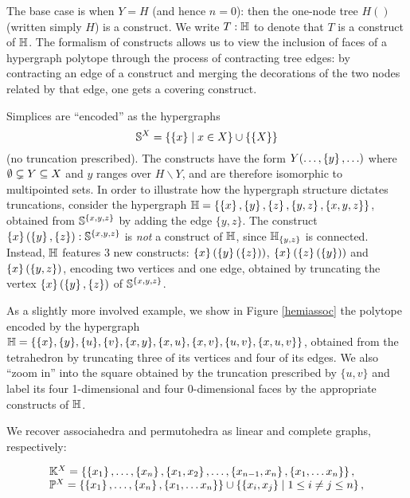 \smallskip
 The base case is when $Y=H$ (and hence $n=0$): then the one-node tree $H()$ (written simply $H$) is a construct.
We write $T:{\mathbb H}$ to denote that $T$ is a construct of ${\mathbb H}$. 
The formalism of constructs   allows us to view the inclusion of faces of a hypergraph polytope through the process of contracting tree edges: by contracting an edge of a construct and  merging the decorations of the two nodes related by that edge, one gets a covering construct.

\smallskip
Simplices are ``encoded'' as the hypergraphs  $${\mathbb S}^X=\left\{\left\{x\right\} \mid x\in X\right\}\cup\left\{\left\{X\right\}\right\}$$ (no truncation prescribed). The constructs have the form $Y(\ldots,\left\{y\right\},\ldots)$ where $\emptyset\subsetneq Y\subseteq X$ and $y$ ranges over $H\backslash Y$, and are therefore isomorphic to multipointed sets. In order to illustrate  how the hypergraph structure dictates truncations, consider the hypergraph ${\mathbb H}=\left\{\left\{x\right\},\left\{y\right\},\left\{z\right\},\left\{y,z\right\}, \left\{x,y,z\right\}\right\}$, obtained from ${\mathbb S}^{\{x,y,z\}}$ by adding the edge $\{y,z\}$. The construct 
 $\left\{x\right\}(\left\{y\right\},\left\{z\right\}):{\mathbb S}^{\{x,y,z\}}$ is {\em not} a construct of ${\mathbb H}$, since ${\mathbb H}_{\left\{y,z\right\}}$ is connected.  Instead, ${\mathbb H}$ features 3 new constructs: 
$\left\{x\right\}(\left\{y\right\}(\left\{z\right\}))$, $\left\{x\right\}(\left\{z\right\}(\left\{y\right\}))$ and $\left\{x\right\}(\left\{y,z\right\})$, encoding two  vertices and one edge, obtained by truncating  the vertex $\left\{x\right\}(\left\{y\right\},\left\{z\right\})$ of ${\mathbb S}^{\{x,y,z\}}$.

As a slightly more involved example, we show in Figure \ref{hemiassoc} the polytope encoded by the hypergraph ${\mathbb H}=\{\{x\},\{y\},\{u\},\{v\},\{x,y\},\{x,u\},\{x,v\},\{u,v\},\{x,u,v\}\}$, obtained from the  tetrahedron by truncating three of its vertices and four of its edges. We also ``zoom in'' into the square obtained by the truncation prescribed by $\{u,v\}$  and label its four 1-dimensional and four 0-dimensional faces by the appropriate constructs of ${\mathbb H}$. 



We recover associahedra and permutohedra as  linear and complete graphs, respectively: 

$$\begin{array}{ll}
{\mathbb K}^X= \left\{\left\{x_1\right\},\ldots,\left\{x_n\right\},\left\{x_1,x_2\right\},\ldots,\left\{x_{n-1},x_n\right\},\left\{x_1,\ldots x_n\right\}\right\}, \\
{\mathbb P}^X= \left\{\left\{x_1\right\},\ldots,\left\{x_n\right\},\left\{x_1,\ldots x_n\right\}\right\} \cup \left\{\left\{x_i,x_j\right\} \mid 1\leq i\neq j\leq n\right\},
\end{array}$$



